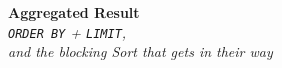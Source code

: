 \documentclass{beamer}
\begin{document}
%
%
%
%
%
%
%

{
\begin{frame}[plain]
\vspace*{\fill}
\begin{center}
{\Huge\bfseries\color{pgblue!85!black} Aggregated Result}\\[10mm]
{\large\itshape \texttt{ORDER BY} + \texttt{LIMIT},\\and the blocking Sort that gets in their way}
\end{center}
\vspace*{\fill}
\end{frame}
}
\end{document}
